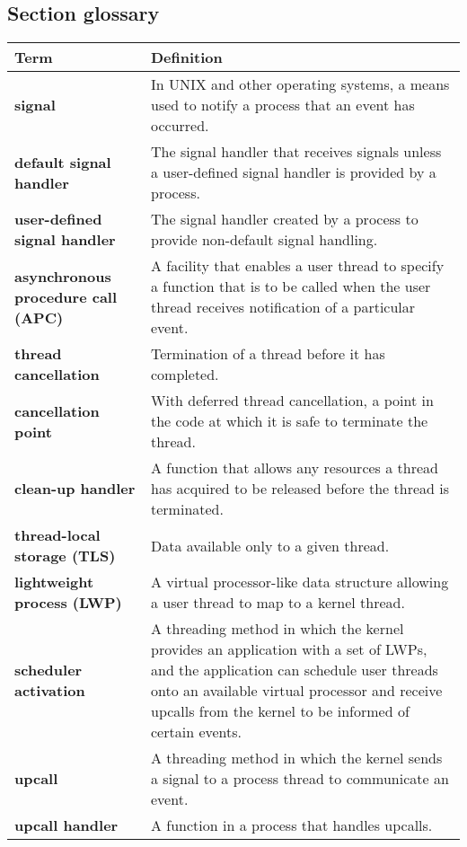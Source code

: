 \subsection*{Section glossary}
\centering
\begin{tabular}{>{\raggedright}p{} >{\raggedright\arraybackslash}p{}}
\toprule
\textbf{Term} & \textbf{Definition} \\
\midrule
\textbf{signal} & In UNIX and other operating systems, a means used to notify a process that an event has occurred. \\
\textbf{default signal handler} & The signal handler that receives signals unless a user-defined signal handler is provided by a process. \\
\textbf{user-defined signal handler} & The signal handler created by a process to provide non-default signal handling. \\
\textbf{asynchronous procedure call (APC)} & A facility that enables a user thread to specify a function that is to be called when the user thread receives notification of a particular event. \\
\textbf{thread cancellation} & Termination of a thread before it has completed. \\
\textbf{cancellation point} & With deferred thread cancellation, a point in the code at which it is safe to terminate the thread. \\
\textbf{clean-up handler} & A function that allows any resources a thread has acquired to be released before the thread is terminated. \\
\textbf{thread-local storage (TLS)} & Data available only to a given thread. \\
\textbf{lightweight process (LWP)} & A virtual processor-like data structure allowing a user thread to map to a kernel thread. \\
\textbf{scheduler activation} & A threading method in which the kernel provides an application with a set of LWPs, and the application can schedule user threads onto an available virtual processor and receive upcalls from the kernel to be informed of certain events. \\
\textbf{upcall} & A threading method in which the kernel sends a signal to a process thread to communicate an event. \\
\textbf{upcall handler} & A function in a process that handles upcalls. \\
\bottomrule
\end{tabular}
\vspace{\baselineskip}
